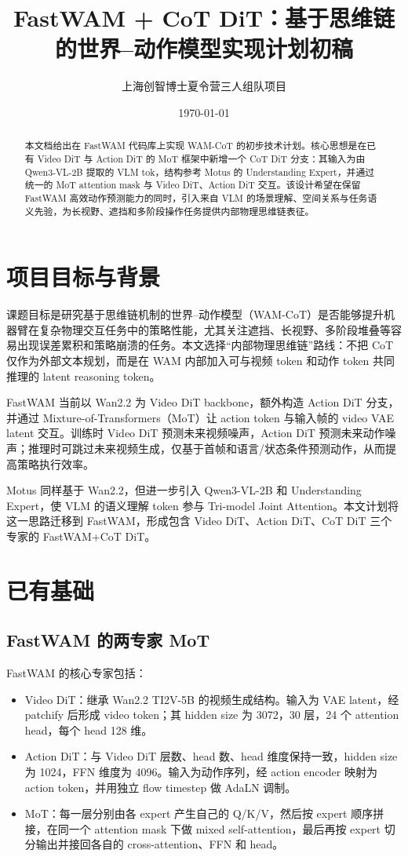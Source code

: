 \documentclass[UTF8,a4paper,11pt]{ctexart}
\title{FastWAM + CoT DiT：基于思维链的世界--动作模型实现计划初稿}
\author{上海创智博士夏令营三人组队项目}
\date{\today}
\begin{document}
\maketitle

\begin{abstract}
本文档给出在 FastWAM 代码库上实现 WAM-CoT 的初步技术计划。核心思想是在已有 Video DiT 与 Action DiT 的 MoT 框架中新增一个 CoT DiT 分支：其输入为由 Qwen3-VL-2B 提取的 VLM tok，结构参考 Motus 的 Understanding Expert，并通过统一的 MoT attention mask 与 Video DiT、Action DiT 交互。该设计希望在保留 FastWAM 高效动作预测能力的同时，引入来自 VLM 的场景理解、空间关系与任务语义先验，为长视野、遮挡和多阶段操作任务提供内部物理思维链表征。
\end{abstract}

\section{项目目标与背景}

课题目标是研究基于思维链机制的世界--动作模型（WAM-CoT）是否能够提升机器臂在复杂物理交互任务中的策略性能，尤其关注遮挡、长视野、多阶段堆叠等容易出现误差累积和策略崩溃的任务。本文选择“内部物理思维链”路线：不把 CoT 仅作为外部文本规划，而是在 WAM 内部加入可与视频 token 和动作 token 共同推理的 latent reasoning token。

FastWAM 当前以 Wan2.2 为 Video DiT backbone，额外构造 Action DiT 分支，并通过 Mixture-of-Transformers（MoT）让 action token 与输入帧的 video VAE latent 交互。训练时 Video DiT 预测未来视频噪声，Action DiT 预测未来动作噪声；推理时可跳过未来视频生成，仅基于首帧和语言/状态条件预测动作，从而提高策略执行效率。

Motus 同样基于 Wan2.2，但进一步引入 Qwen3-VL-2B 和 Understanding Expert，使 VLM 的语义理解 token 参与 Tri-model Joint Attention。本文计划将这一思路迁移到 FastWAM，形成包含 Video DiT、Action DiT、CoT DiT 三个专家的 FastWAM+CoT DiT。

\section{已有基础}

\subsection{FastWAM 的两专家 MoT}

FastWAM 的核心专家包括：
\begin{itemize}[leftmargin=1.6em]
  \item Video DiT：继承 Wan2.2 TI2V-5B 的视频生成结构。输入为 VAE latent，经 patchify 后形成 video token；其 hidden size 为 3072，30 层，24 个 attention head，每个 head 128 维。
  \item Action DiT：与 Video DiT 层数、head 数、head 维度保持一致，hidden size 为 1024，FFN 维度为 4096。输入为动作序列，经 action encoder 映射为 action token，并用独立 flow timestep 做 AdaLN 调制。
  \item MoT：每一层分别由各 expert 产生自己的 Q/K/V，然后按 expert 顺序拼接，在同一个 attention mask 下做 mixed self-attention，最后再按 expert 切分输出并接回各自的 cross-attention、FFN 和 head。
\end{itemize}
\end{document}
